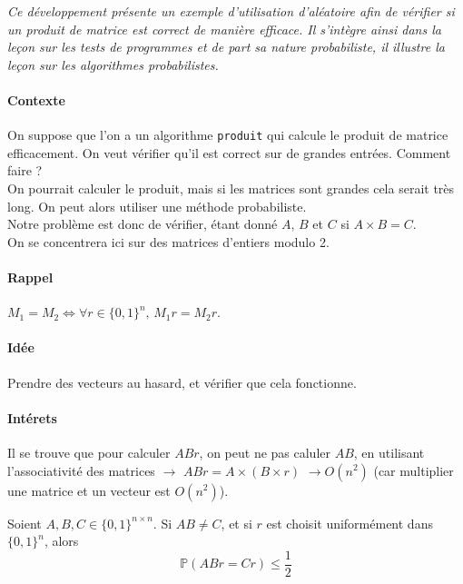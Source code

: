 
\textit{Ce développement présente un exemple d'utilisation d'aléatoire afin de vérifier si un produit de matrice est correct de manière efficace. Il s'intègre ainsi dans la leçon sur les tests de programmes et de part sa nature probabiliste, il illustre la leçon sur les algorithmes probabilistes. }


\paragraph{Contexte} On suppose que l'on a un algorithme \texttt{produit} qui calcule le produit de matrice efficacement. On veut vérifier qu'il est correct sur de grandes entrées. Comment faire ?\\

On pourrait calculer le produit, mais si les matrices sont grandes cela serait très long. On peut alors utiliser une méthode probabiliste.\\

Notre problème est donc de vérifier, étant donné $A$, $B$ et $C$ si $A\times B = C$.\\
On se concentrera ici sur des matrices d'entiers modulo 2.

\paragraph{Rappel} $M_1 = M_2 \Leftrightarrow \forall r \in \{0,1\}^n, \, M_1r = M_2r$.

\paragraph{Idée} Prendre des vecteurs au hasard, et vérifier que cela fonctionne.

\paragraph{Intérets} Il se trouve que pour calculer $ABr$, on peut ne pas caluler $AB$, en utilisant l'associativité des matrices $\to$ $ABr = A \times (B \times r)$ $\to O(n^2)$ (car multiplier une matrice et un vecteur est $O(n^2)$). 

\begin{theorem}\label{ThmVerif}
Soient $A,B,C\in \{0,1\}^{n\times n}$. Si $AB\neq C$, et si $r$ est choisit uniformément dans $\{0,1\}^n$, alors 
$$
\mathbb{P}(ABr =Cr) \leq \frac{1}{2}
$$
\end{theorem}

